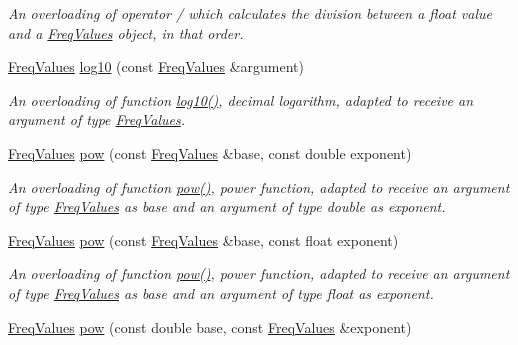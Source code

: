 \begin{DoxyCompactItemize}
\begin{DoxyCompactList}\small\item\em An overloading of operator / which calculates the division between a {\itshape float} value and a {\itshape \hyperlink{structFreqValues}{Freq\+Values}} object, in that order. \end{DoxyCompactList}\item 
\hyperlink{structFreqValues}{Freq\+Values} \hyperlink{structFreqValues_a90781867604621a99e59d4fcdc4a5f38}{log10} (const \hyperlink{structFreqValues}{Freq\+Values} \&argument)
\begin{DoxyCompactList}\small\item\em An overloading of function {\ttfamily \hyperlink{structFreqValues_a90781867604621a99e59d4fcdc4a5f38}{log10()}}, decimal logarithm, adapted to receive an argument of type {\itshape \hyperlink{structFreqValues}{Freq\+Values}}. \end{DoxyCompactList}\item 
\hyperlink{structFreqValues}{Freq\+Values} \hyperlink{structFreqValues_a337378f9483d9399a5872d3b16ad497e}{pow} (const \hyperlink{structFreqValues}{Freq\+Values} \&base, const double exponent)
\begin{DoxyCompactList}\small\item\em An overloading of function {\ttfamily \hyperlink{structFreqValues_a337378f9483d9399a5872d3b16ad497e}{pow()}}, power function, adapted to receive an argument of type {\itshape \hyperlink{structFreqValues}{Freq\+Values}} as base and an argument of type {\itshape double} as exponent. \end{DoxyCompactList}\item 
\mbox{\label{structFreqValues_a8b8ee90b9d108ad7008a3613b31253e7}} 
\hyperlink{structFreqValues}{Freq\+Values} \hyperlink{structFreqValues_a8b8ee90b9d108ad7008a3613b31253e7}{pow} (const \hyperlink{structFreqValues}{Freq\+Values} \&base, const float exponent)
\begin{DoxyCompactList}\small\item\em An overloading of function {\ttfamily \hyperlink{structFreqValues_a337378f9483d9399a5872d3b16ad497e}{pow()}}, power function, adapted to receive an argument of type {\itshape \hyperlink{structFreqValues}{Freq\+Values}} as base and an argument of type {\itshape float} as exponent. \end{DoxyCompactList}\item 
\hyperlink{structFreqValues}{Freq\+Values} \hyperlink{structFreqValues_a04cc1cee137dba78c365af490aa9ebaa}{pow} (const double base, const \hyperlink{structFreqValues}{Freq\+Values} \&exponent)

\end{DoxyCompactItemize}
